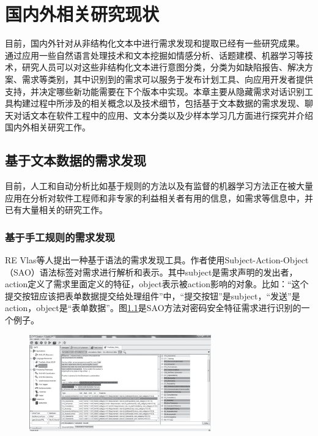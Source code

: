 \chapter{国内外相关研究现状}\label{chap:related_work}

目前，国内外针对从非结构化文本中进行需求发现和提取已经有一些研究成果。
通过应用一些自然语言处理技术和文本挖掘如情感分析、话题建模、机器学习等技术，研究人员可以对这些非结构化文本进行意图分类，分类为如缺陷报告、解决方案、需求等类别\cite{maalej2015bug}，其中识别到的需求可以服务于发布计划工具、向应用开发者提供支持，并决定哪些新功能需要在下个版本中实现。本章主要从隐藏需求对话识别工具构建过程中所涉及的相关概念以及技术细节，包括基于文本数据的需求发现、聊天对话文本在软件工程中的应用、文本分类以及少样本学习几方面进行探究并介绍国内外相关研究工作。

\section{基于文本数据的需求发现}


目前，人工和自动分析比如基于规则的方法以及有监督的机器学习方法正在被大量应用在分析对软件工程师和非专家的利益相关者有用的信息，如需求等信息中\cite{Morales2019Speech}，并已有大量相关的研究工作。
\subsection{基于手工规则的需求发现}

RE Vlas等人\cite{morales2014discovering}提出一种基于语法的需求发现工具。作者使用Subject-Action-Object（SAO）语法标签对需求进行解析和表示。其中subject是需求声明的发出者，action定义了需求里面定义的特征，object表示被action影响的对象。比如：“这个提交按钮应该把表单数据提交给处理组件”中，“提交按钮”是subject，“发送”是action，object是“表单数据”。图\ref{fig:sao}是SAO方法对密码安全特征需求进行识别的一个例子。
\begin{figure}[htbp]
    \centering
    \includegraphics[width=0.70\textwidth]{Img/sao.png}
    \label{fig:sao}
\end{figure}


